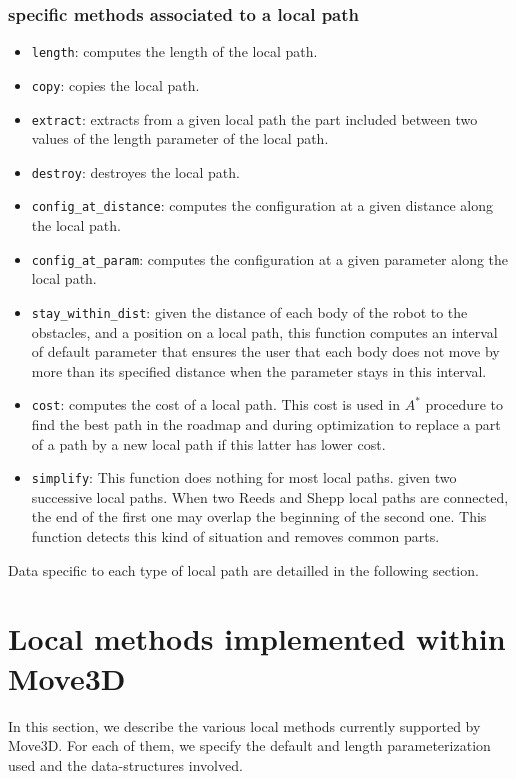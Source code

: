 \subsubsection*{specific methods associated to a local path}
\begin{itemize}
\item {\tt length}: computes the length of the local path.
\item {\tt copy}: copies the local path.
\item {\tt extract}: extracts from a given local path the part included between two values of the length parameter of the local path.
\item {\tt destroy}: destroyes the local path.
\item {\tt config\_at\_distance}: computes the configuration at a given
  distance along the local path.
\item {\tt config\_at\_param}: computes the configuration at a given
  parameter along the local path.
\item {\tt stay\_within\_dist}: given the distance of each body of the
  robot to the obstacles, and a position on a local path, this
  function computes an interval of default parameter that ensures the
  user that each body does not move by more than its specified
  distance when the parameter stays in this interval.
\item {\tt cost}: computes the cost of a local path. This cost is used
  in $A^{*}$ procedure to find the best path in the roadmap and during
  optimization to replace a part of a path by a new local path if this
  latter has lower cost.
\item {\tt simplify}: This function does nothing for most local
  paths. given two successive local paths. When two Reeds and Shepp
  local paths are connected, the end of the first one may overlap the
  beginning of the second one. This function detects this kind of
  situation and removes common parts.
\end{itemize}

Data specific to each type of local path are detailled in the
following section.

\section{Local methods implemented within Move3D}

In this section, we describe the various local methods currently supported 
by Move3D. For each of them, we specify the default and length parameterization
used and the data-structures involved.

